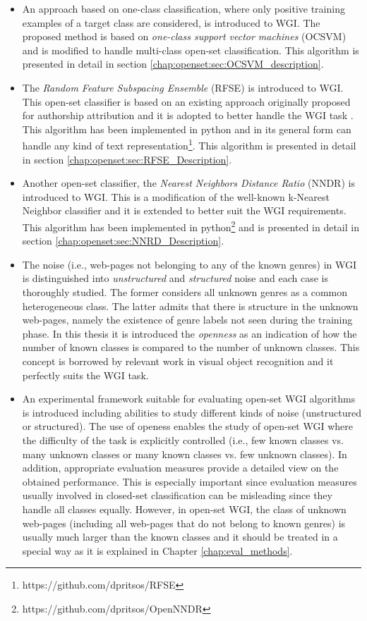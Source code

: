 \begin{itemize}
\begin{itemize}
\item An approach based on one-class classification, where only positive training examples of a target class are considered, is introduced to WGI. The proposed method is based on \textit{one-class support vector machines} (OCSVM) and is modified to handle multi-class open-set classification. This algorithm is presented in detail in section \ref{chap:openset:sec:OCSVM_description}.
\item The \textit{Random Feature Subspacing Ensemble} (RFSE) is introduced to WGI. This open-set classifier is based on an existing approach originally proposed for authorship attribution and it is adopted to better handle the WGI task \parencite{koppel2011authorship}. This algorithm has been implemented in python and in its general form can handle any kind of text representation\footnote{https://github.com/dpritsos/RFSE}. This algorithm is presented in detail in section \ref{chap:openset:sec:RFSE_Description}.
\item Another open-set classifier, the \textit{Nearest Neighbors Distance Ratio} (NNDR) is introduced to WGI. This is a modification of the well-known k-Nearest Neighbor classifier \parencite{mendesjunior2016} and it is extended to better suit the WGI requirements. This algorithm has been implemented in python\footnote{https://github.com/dpritsos/OpenNNDR} and is presented in detail in section \ref{chap:openset:sec:NNRD_Description}.
\item The noise (i.e., web-pages not belonging to any of the known genres) in WGI is distinguished into \textit{unstructured} and \textit{structured} noise and each case is thoroughly studied. The former considers all unknown genres as a common heterogeneous class. The latter admits that there is structure in the unknown web-pages, namely the existence of genre labels not seen during the training phase. In this thesis it is introduced the \textit{openness} as an indication of how the number of known classes is compared to the number of unknown classes. This concept is borrowed by relevant work in visual object recognition \parencite{scheirer2013toward} and it perfectly suits the WGI task.
\item An experimental framework suitable for evaluating open-set WGI algorithms is introduced including abilities to study different kinds of noise (unstructured or structured). The use of openess enables the study of open-set WGI where the difficulty of the task is explicitly controlled (i.e., few known classes vs. many unknown classes or many known classes vs. few unknown classes). In addition, appropriate evaluation measures provide a detailed view on the obtained performance. This is especially important since evaluation measures usually involved in closed-set classification can be misleading since they handle all classes equally. However, in open-set WGI, the class of unknown web-pages (including all web-pages that do not belong to known genres) is usually much larger than the known classes and it should be treated in a special way as it is explained in Chapter \ref{chap:eval_methods}. 

\end{itemize}
\end{itemize}
